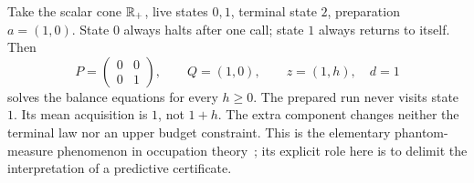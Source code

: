 \begin{example}\label{ex:phantom}
Take the scalar cone $\mathbb R_+$, live states $0,1$, terminal state $2$, preparation $a=(1,0)$. State $0$ always halts after one call; state $1$ always returns to itself. Then
\[
 P=\begin{pmatrix}0&0\\0&1\end{pmatrix},\qquad Q=(1,0),\qquad z=(1,h),\quad d=1
\]
solves the balance equations for every $h\ge0$. The prepared run never visits state $1$. Its mean acquisition is $1$, not $1+h$. The extra component changes neither the terminal law nor an upper budget constraint. This is the elementary phantom-measure phenomenon in occupation theory~\cite{DPR}; its explicit role here is to delimit the interpretation of a predictive certificate.
\end{example}

